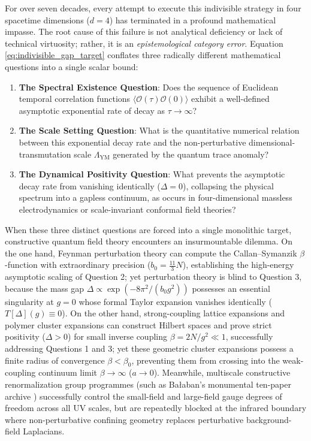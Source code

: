 For over seven decades, every attempt to execute this indivisible strategy in four spacetime dimensions ($d = 4$) has terminated in a profound mathematical impasse. The root cause of this failure is not analytical deficiency or lack of technical virtuosity; rather, it is an \emph{epistemological category error}. Equation \eqref{eq:indivisible_gap_target} conflates three radically different mathematical questions into a single scalar bound:
\begin{enumerate}
    \item \textbf{The Spectral Existence Question}: Does the sequence of Euclidean temporal correlation functions $\langle \mathcal{O}(\tau) \mathcal{O}(0) \rangle$ exhibit a well-defined asymptotic exponential rate of decay as $\tau \to \infty$?
    \item \textbf{The Scale Setting Question}: What is the quantitative numerical relation between this exponential decay rate and the non-perturbative dimensional-transmutation scale $\Lambda_{\mathrm{YM}}$ generated by the quantum trace anomaly?
    \item \textbf{The Dynamical Positivity Question}: What prevents the asymptotic decay rate from vanishing identically ($\Delta = 0$), collapsing the physical spectrum into a gapless continuum, as occurs in four-dimensional massless electrodynamics or scale-invariant conformal field theories?
\end{enumerate}

When these three distinct questions are forced into a single monolithic target, constructive quantum field theory encounters an insurmountable dilemma. On the one hand, Feynman perturbation theory can compute the Callan--Symanzik $\beta$-function with extraordinary precision ($b_0 = \frac{11}{3}N$), establishing the high-energy asymptotic scaling of Question 2; yet perturbation theory is blind to Question 3, because the mass gap $\Delta \propto \exp(-8\pi^2/(b_0 g^2))$ possesses an essential singularity at $g = 0$ whose formal Taylor expansion vanishes identically ($T[\Delta](g) \equiv 0$). On the other hand, strong-coupling lattice expansions and polymer cluster expansions can construct Hilbert spaces and prove strict positivity ($\Delta > 0$) for small inverse coupling $\beta = 2N/g^2 \ll 1$, successfully addressing Questions 1 and 3; yet these geometric cluster expansions possess a finite radius of convergence $\beta < \beta_0$, preventing them from crossing into the weak-coupling continuum limit $\beta \to \infty$ ($a \to 0$). Meanwhile, multiscale constructive renormalization group programmes (such as Ba{\l}aban's monumental ten-paper archive \cite{Balaban1984a,Balaban1985a,Balaban1987,Balaban1988a,Balaban1989}) successfully control the small-field and large-field gauge degrees of freedom across all UV scales, but are repeatedly blocked at the infrared boundary where non-perturbative confining geometry replaces perturbative background-field Laplacians.

